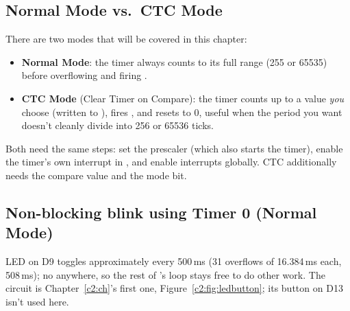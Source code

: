 \subsection{Normal Mode vs.\ CTC Mode}
\label{c5:a:3}
There are two modes that will be covered in this chapter:
\begin{itemize}
  \item \textbf{Normal Mode}: the timer always counts to its full range (255 or 65535) before
    overflowing and firing .
  \item \textbf{CTC Mode} (Clear Timer on Compare): the timer counts up to a value \emph{you}
    choose (written to ), fires , and resets to 0, useful when
    the period you want doesn't cleanly divide into 256 or 65536 ticks.
\end{itemize}
Both need the same steps: set the prescaler (which also starts the timer), enable the timer's own
interrupt in , and enable interrupts globally. CTC additionally needs the compare
value and the mode bit.

\subsection{Non-blocking blink using Timer 0 (Normal Mode)}
\label{c5:a:4}
LED on D9 toggles approximately every 500\,ms (31 overflows of 16.384\,ms each, 508\,ms); no
 anywhere, so the rest of 's loop stays free to do other work. The
circuit is Chapter~\ref{c2:ch}'s first one, Figure~\ref{c2:fig:ledbutton}; its button on D13 isn't
used here.

